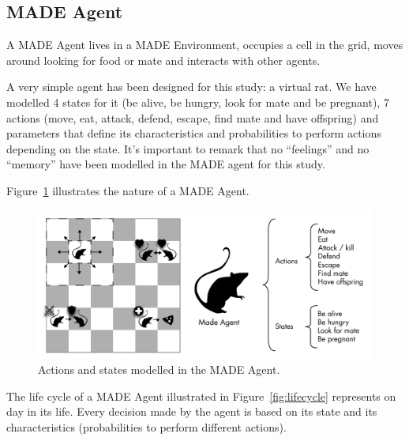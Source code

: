 \documentclass[runningheads]{llncs}
\begin{document}


\subsection{MADE Agent}
A MADE Agent lives in a MADE Environment, occupies a cell in the grid, moves around looking for food or mate and interacts with other agents.

A very simple agent has been designed for this study: a virtual rat. We have modelled 4 states for it (be alive, be hungry, look for mate and be pregnant), 7 actions (move, eat, attack, defend, escape, find mate and have offspring) and parameters that define its characteristics and probabilities to perform actions depending on the state. It's important to remark that no ``feelings'' and no ``memory'' have been modelled in the MADE agent for this study.

Figure~\ref{fig:madeAgent} illustrates the nature of a MADE Agent.

\begin{figure}
\begin{center}
\includegraphics[scale=0.65]{img/MadeAgent.pdf}
\caption{Actions and states modelled in the MADE Agent.}
\label{fig:madeAgent}
\end{center}
\end{figure}

The life cycle of a MADE Agent illustrated in Figure~\ref{fig:lifecycle} represents on day in its life. Every decision made by the agent is based on its state and its characteristics (probabilities to perform different actions).
\end{document}
